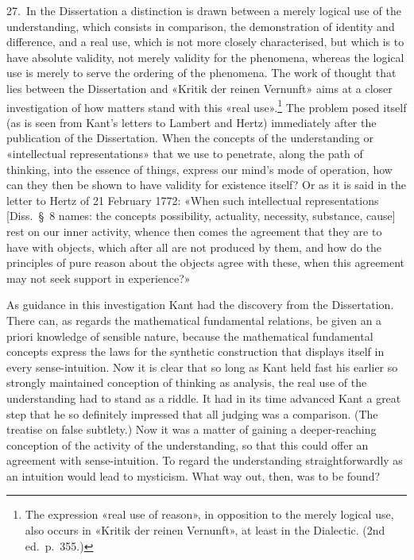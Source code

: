 \documentclass[12pt,a4paper]{article}
\begin{document}
27.\ In the Dissertation a distinction is drawn between a merely logical use
of the understanding, which consists in comparison, the demonstration of
identity and difference, and a real use, which is not more closely
characterised, but which is to have absolute validity, not merely validity
for the phenomena, whereas the logical use is merely to serve the ordering of
the phenomena. The work of thought that lies between the Dissertation and
«Kritik der reinen Vernunft» aims at a closer investigation of how matters
stand with this «real use».\footnote{The expression «real use of reason», in
opposition to the merely logical use, also occurs in «Kritik der reinen
Vernunft», at least in the Dialectic. (2nd ed.\ p.\ 355.)} The problem posed
itself (as is seen from Kant's letters to Lambert and Hertz) immediately
after the publication of the Dissertation. When the concepts of the
understanding or «intellectual representations» that we use to penetrate, along
the path of thinking, into the essence of things, express our mind's mode of
operation, how can they then be shown to have validity for existence itself?
Or as it is said in the letter to Hertz of 21 February 1772: «When such
intellectual representations [Diss.\ §\ 8 names: the concepts possibility,
actuality, necessity, substance, cause] rest on our inner activity, whence
then comes the agreement that they are to have with objects, which after all
are not produced by them, and how do the principles of pure reason about the
objects agree with these, when this agreement may not seek support in
experience?»

As guidance in this investigation Kant had the discovery from the
Dissertation. There can, as regards the mathematical fundamental relations,
be given an a priori knowledge of sensible nature, because the mathematical
fundamental concepts express the laws for the synthetic construction that
displays itself in every sense-intuition. Now it is clear that so long as Kant
held fast his earlier so strongly maintained conception of thinking as
analysis, the real use of the understanding had to stand as a riddle. It had
in its time advanced Kant a great step that he so definitely impressed that
all judging was a comparison. (The treatise on false subtlety.) Now it was a
matter of gaining a deeper-reaching conception of the activity of the
understanding, so that this could offer an agreement with sense-intuition. To
regard the understanding straightforwardly as an intuition would lead to
mysticism. What way out, then, was to be found?
\end{document}
